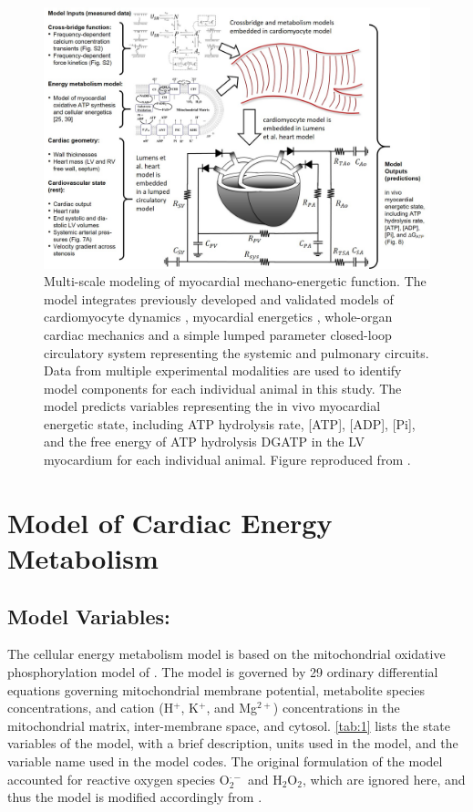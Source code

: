 \documentclass[fleqn,10pt]{physiome}
\begin{document}
\begin{figure}[ht]\centering
\includegraphics[width=1.0\linewidth]{Figure1}
\caption{Multi-scale modeling of myocardial mechano-energetic function. The model integrates previously developed and validated models of cardiomyocyte dynamics \citep{Tewari2016a,Tewari2016b}, myocardial energetics \citep{Bazil2016, Gao2019}, whole-organ cardiac mechanics \citep{Lumens2009} and a simple lumped parameter closed-loop circulatory system representing the systemic and pulmonary circuits. Data from multiple experimental modalities are used to identify model components for each individual animal in this study. The model predicts variables representing the in vivo myocardial energetic state, including ATP hydrolysis rate, [ATP], [ADP], [Pi], and the free energy of ATP hydrolysis DGATP in the LV myocardium for each individual animal. Figure reproduced from \cite{Lopez2020}.}
\label{fig:overview}
\end{figure}

\section{Model of Cardiac Energy Metabolism}

\subsection{Model Variables:}

The cellular energy metabolism model is based on the mitochondrial oxidative phosphorylation model of \cite{Bazil2016}. The model is governed by 29 ordinary differential equations governing mitochondrial membrane potential, metabolite species concentrations, and cation (H$^+$, K$^+$, and Mg$^{2+}$) concentrations in the mitochondrial matrix, inter-membrane space, and cytosol. \autoref{tab:1} lists the state variables of the model, with a brief description, units used in the model, and the variable name used in the model codes. The original formulation of the model accounted for reactive oxygen species O$_2^{\cdot -}$ and H$_2$O$_2$, which are ignored here, and thus the model is modified accordingly from \cite{Bazil2016}.
\end{document}

